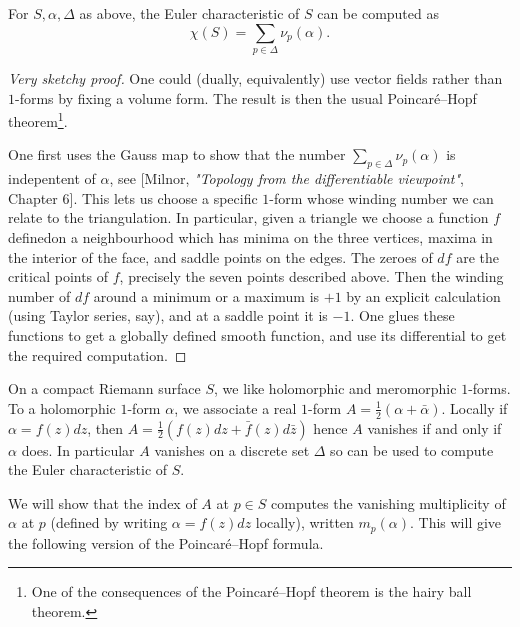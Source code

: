 \begin{proposition}
    For \(S, \alpha, \Delta\) as above, the Euler characteristic of \(S\) can be
    computed as \[\chi(S)=\sum_{p\in \Delta} \nu_p(\alpha).\]
    \begin{proof}[Very sketchy proof]
        One could (dually, equivalently) use vector fields rather than
        \(1\)-forms by fixing a volume form. The result is then the usual
        Poincar\'e--Hopf theorem\footnote{One of the consequences of the
        Poincar\'e--Hopf theorem is the hairy ball theorem.}.

        One first uses the Gauss map to show that the number \(\sum_{p\in
        \Delta}\nu_p(\alpha)\) is indepentent of \(\alpha\), see [Milnor,
        \textit{"Topology from the differentiable viewpoint"}, Chapter 6]. This
        lets us choose a specific \(1\)-form whose winding number we can relate
        to the triangulation. In particular, given a triangle we choose a
        function \(f\) definedon a neighbourhood which has minima on the three
        vertices, maxima in the interior of the face, and saddle points on the
        edges. The zeroes of \(df\) are the critical points of \(f\), precisely
        the seven points described above. Then the winding number of \(df\)
        around a minimum or a maximum is \(+1\) by an explicit calculation
        (using Taylor series, say), and at a saddle point it is \(-1\). One
        glues these functions to get a globally defined smooth function, and use
        its differential to get the required computation.
    \end{proof}
\end{proposition}

On a compact Riemann surface \(S\), we like holomorphic and meromorphic
\(1\)-forms.  To a holomorphic \(1\)-form \(\alpha\), we associate a real
\(1\)-form \(A=\frac{1}{2}(\alpha +\bar\alpha)\). Locally if \(\alpha=f(z)dz\),
then \(A= \frac{1}{2}(f(z)dz +\bar f(z)d\bar z)\) hence \(A\) vanishes if and
only if \(\alpha\) does. In particular \(A\) vanishes on a discrete set
\(\Delta\) so can be used to compute the Euler characteristic of \(S\).

We will show that the index of \(A\) at \(p\in S\) computes the vanishing
multiplicity of \(\alpha\) at \(p\) (defined by writing \(\alpha=f(z)dz\)
locally), written \(m_p(\alpha)\). This will give
the following version of the Poincar\'e--Hopf formula.

